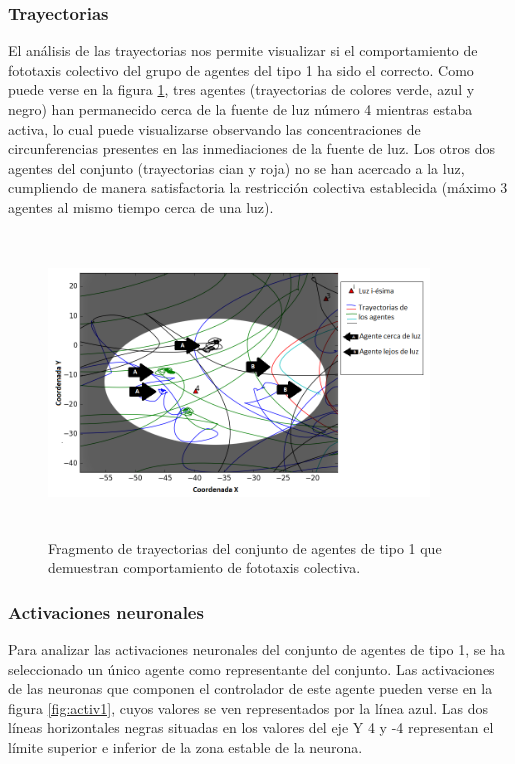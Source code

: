 \subsubsection{Trayectorias}
El análisis de las trayectorias nos permite visualizar si el comportamiento de fototaxis colectivo del grupo de agentes del tipo 1 ha sido el correcto. Como puede verse en la figura \ref{fig:agente1Trayectoria}, tres agentes (trayectorias de colores verde, azul y negro) han permanecido cerca de la fuente de luz número 4 mientras estaba activa, lo cual puede visualizarse observando
las concentraciones de circunferencias presentes en las inmediaciones de la fuente de luz. Los otros dos agentes del conjunto (trayectorias cian y roja) no se han acercado a la luz, cumpliendo de manera satisfactoria la restricción colectiva establecida (máximo 3 agentes al mismo tiempo cerca de una luz).

\begin{figure}[H]
    \centering
    \includegraphics[width=0.9\textwidth,height=8cm]{Imagenes/Agente1Trayectoria}
    \caption{Fragmento de trayectorias del conjunto de agentes de tipo 1 que demuestran comportamiento de fototaxis colectiva.}
    \label{fig:agente1Trayectoria}
\end{figure}

\subsubsection{Activaciones neuronales}
Para analizar las activaciones neuronales del conjunto de agentes de tipo 1, se ha seleccionado un único agente como representante del conjunto. Las activaciones de las neuronas que componen el controlador de este agente pueden verse en la figura \ref{fig:activ1}, cuyos valores se ven representados por la línea azul. Las dos líneas horizontales negras situadas en los valores del eje Y 4 y -4 representan
el límite superior e inferior de la zona estable de la neurona.

